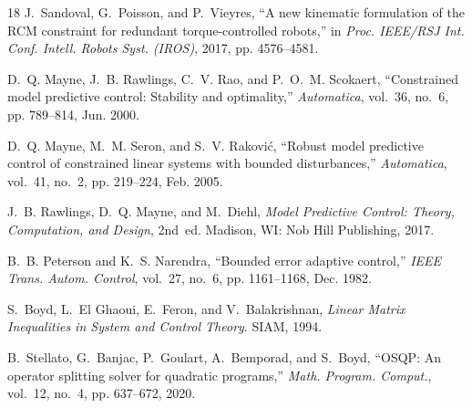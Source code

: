 \begin{thebibliography}{18}
J.~Sandoval, G.~Poisson, and P.~Vieyres, ``A new kinematic formulation of the RCM constraint for redundant torque-controlled robots,'' in \emph{Proc. IEEE/RSJ Int. Conf. Intell. Robots Syst. (IROS)}, 2017, pp. 4576--4581.

D.~Q. Mayne, J.~B. Rawlings, C.~V. Rao, and P.~O.~M. Scokaert, ``Constrained model predictive control: Stability and optimality,'' \emph{Automatica}, vol.~36, no.~6, pp. 789--814, Jun. 2000.

D.~Q. Mayne, M.~M. Seron, and S.~V. Rakovi\'{c}, ``Robust model predictive control of constrained linear systems with bounded disturbances,'' \emph{Automatica}, vol.~41, no.~2, pp. 219--224, Feb. 2005.

J.~B. Rawlings, D.~Q. Mayne, and M.~Diehl, \emph{Model Predictive Control: Theory, Computation, and Design}, 2nd~ed. Madison, WI: Nob Hill Publishing, 2017.

B.~B. Peterson and K.~S. Narendra, ``Bounded error adaptive control,'' \emph{IEEE Trans. Autom. Control}, vol.~27, no.~6, pp. 1161--1168, Dec. 1982.

S.~Boyd, L.~El Ghaoui, E.~Feron, and V.~Balakrishnan, \emph{Linear Matrix Inequalities in System and Control Theory}. SIAM, 1994.

B.~Stellato, G.~Banjac, P.~Goulart, A.~Bemporad, and S.~Boyd, ``OSQP: An operator splitting solver for quadratic programs,'' \emph{Math. Program. Comput.}, vol.~12, no.~4, pp. 637--672, 2020.

\end{thebibliography}
